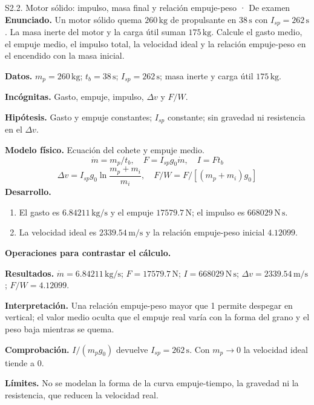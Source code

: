 \begin{studiumworked}{S2.2. Motor sólido: impulso, masa final y relación empuje-peso · De examen}
\textbf{Enunciado.} Un motor sólido quema $260\,\mathrm{kg}$ de propulsante en $38\,\mathrm s$ con $I_{sp}=262\,\mathrm s$. La masa inerte del motor y la carga útil suman $175\,\mathrm{kg}$. Calcule el gasto medio, el empuje medio, el impulso total, la velocidad ideal y la relación empuje-peso en el encendido con la masa inicial.

\textbf{Datos.} $m_p=260\,\mathrm{kg}$; $t_b=38\,\mathrm s$; $I_{sp}=262\,\mathrm s$; masa inerte y carga útil $175\,\mathrm{kg}$.

\textbf{Incógnitas.} Gasto, empuje, impulso, $\Delta v$ y $F/W$.

\textbf{Hipótesis.} Gasto y empuje constantes; $I_{sp}$ constante; sin gravedad ni resistencia en el $\Delta v$.

\textbf{Modelo físico.} Ecuación del cohete y empuje medio.
\[\dot m=m_p/t_b,\quad F=I_{sp}g_0\dot m,\quad I=Ft_b\]
\[\Delta v=I_{sp}g_0\ln\frac{m_p+m_i}{m_i},\quad F/W=F/[(m_p+m_i)g_0]\]
\textbf{Desarrollo.}
\begin{enumerate}
\item El gasto es $6.84211\,\mathrm{kg/s}$ y el empuje $17579.7\,\mathrm N$; el impulso es $668029\,\mathrm{N\,s}$.
\item La velocidad ideal es $2339.54\,\mathrm{m/s}$ y la relación empuje-peso inicial $4.12099$.
\end{enumerate}
\textbf{Operaciones para contrastar el cálculo.}

\textbf{Resultados.} $\dot m=6.84211\,\mathrm{kg/s}$; $F=17579.7\,\mathrm N$; $I=668029\,\mathrm{N\,s}$; $\Delta v=2339.54\,\mathrm{m/s}$; $F/W=4.12099$.

\textbf{Interpretación.} Una relación empuje-peso mayor que 1 permite despegar en vertical; el valor medio oculta que el empuje real varía con la forma del grano y el peso baja mientras se quema.

\textbf{Comprobación.} $I/(m_pg_0)$ devuelve $I_{sp}=262\,\mathrm s$. Con $m_p\to0$ la velocidad ideal tiende a 0.

\textbf{Límites.} No se modelan la forma de la curva empuje-tiempo, la gravedad ni la resistencia, que reducen la velocidad real.
\end{studiumworked}
